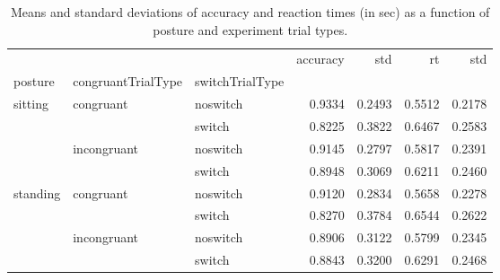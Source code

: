 \begin{table}
\centering
\caption{Means and standard deviations of accuracy and reaction times (in sec) as a function of posture and experiment trial types.}
\label{table-task-switching-replication-reaction-time}
\begin{tabular}{lllrrrr}
\toprule
         &             &        & accuracy &    std &     rt &    std \\
posture & congruantTrialType & switchTrialType &          &        &        &        \\
\midrule
sitting & congruant & noswitch &   0.9334 & 0.2493 & 0.5512 & 0.2178 \\
         &             & switch &   0.8225 & 0.3822 & 0.6467 & 0.2583 \\
         & incongruant & noswitch &   0.9145 & 0.2797 & 0.5817 & 0.2391 \\
         &             & switch &   0.8948 & 0.3069 & 0.6211 & 0.2460 \\
standing & congruant & noswitch &   0.9120 & 0.2834 & 0.5658 & 0.2278 \\
         &             & switch &   0.8270 & 0.3784 & 0.6544 & 0.2622 \\
         & incongruant & noswitch &   0.8906 & 0.3122 & 0.5799 & 0.2345 \\
         &             & switch &   0.8843 & 0.3200 & 0.6291 & 0.2468 \\
\bottomrule
\end{tabular}
\end{table}
